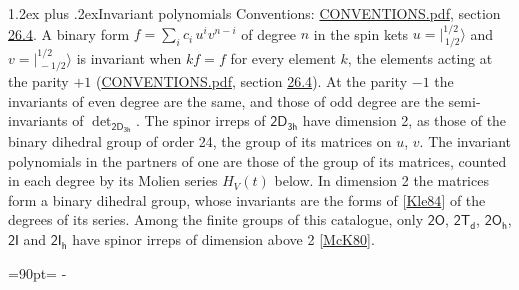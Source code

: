 \documentclass[10pt,a4paper]{article}
\makeatletter
\renewcommand\section{\@startsection{section}{1}{\z@}{-3ex plus -1ex minus -.2ex}%
  {1.2ex plus .2ex}{\normalfont\large\sffamily\bfseries\color{parttitle}}}
\newcommand{\needspace}[1]{\par\penalty-100\begingroup\dimen0=#1\relax\dimen2=\pagegoal
  \advance\dimen2-\pagetotal\ifdim\dimen0>\dimen2\relax\ifdim\dimen2>0pt\vfil\break\fi\fi
  \endgroup}
\numberwithin{equation}{section}
\newcommand{\grp}[1]{\mathsf{#1}}
\newcommand{\jm}[2]{\bigl\lvert{}^{#1}_{\,#2}\bigr\rangle}
\makeatother
\begin{document}
\section{Invariant polynomials}\label{s:invariants}
Conventions: \href{../../CONVENTIONS.pdf}{CONVENTIONS.pdf}, section \href{../../CONVENTIONS.pdf\#conv.26.4}{26.4}.
\leavevmode\label{n:local.binary.form}A binary form $f = \sum_i c_i\, u^i v^{n-i}$ of degree $n$ in the spin kets $u = \jm{1/2}{1/2}$ and $v = \jm{1/2}{-1/2}$ is invariant when $k f = f$ for every element $k$, the elements acting at the parity $+1$ (\href{../../CONVENTIONS.pdf}{CONVENTIONS.pdf}, section \href{../../CONVENTIONS.pdf\#conv.26.4}{26.4}). At the parity $-1$ the invariants of even degree are the same, and those of odd degree are the semi-invariants of $\det_{\grp{2D_{3h}}}$.
The spinor irreps of $\grp{2D_{3h}}$ have dimension 2, as those of the binary dihedral group of order 24, the group of its matrices on $u$, $v$. \label{n:function.hilbert}The invariant polynomials in the partners of one are those of the group of its matrices, counted in each degree by its Molien series $H_V(t)$ below. In dimension 2 the matrices form a binary dihedral group, whose invariants are the forms of [\href{../../../REFERENCES.pdf\#ref.Kle84}{Kle84}] of the degrees of its series. Among the finite groups of this catalogue, only $\grp{2O}$, $\grp{2T_{d}}$, $\grp{2O_{h}}$, $\grp{2I}$ and $\grp{2I_{h}}$ have spinor irreps of dimension above 2 [\href{../../../REFERENCES.pdf\#ref.McK80}{McK80}].
\needspace{90pt}
\end{document}
